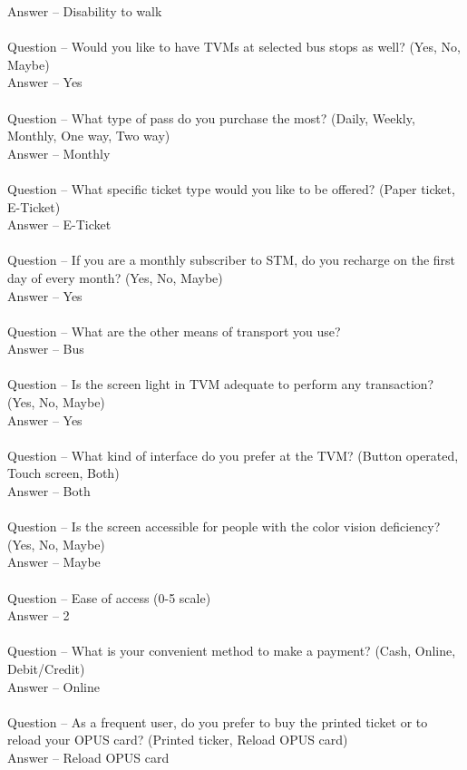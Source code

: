 \documentclass[a4paper, 11pt]{report}
\begin{document}
{Answer – Disability to walk\\\\
Question – Would you like to have TVMs at selected bus stops as well? (Yes, No, Maybe)\\
Answer – Yes\\\\
Question – What type of pass do you purchase the most? (Daily, Weekly, Monthly, One way, Two way)\\
Answer – Monthly\\\\
Question – What specific ticket type would you like to be offered? (Paper ticket, E-Ticket)\\
Answer – E-Ticket\\\\
Question – If you are a monthly subscriber to STM, do you recharge on the first day of every month? (Yes, No, Maybe)\\
Answer – Yes\\\\
Question – What are the other means of transport you use?  \\
Answer – Bus\\\\
Question – Is the screen light in TVM adequate to perform any transaction? (Yes, No, Maybe)\\
Answer – Yes\\\\
Question – What kind of interface do you prefer at the TVM? (Button operated, Touch screen, Both)\\
Answer – Both\\\\
Question – Is the screen accessible for people with the color vision deficiency? (Yes, No, Maybe)\\
Answer – Maybe\\\\
Question – Ease of access (0-5 scale)\\
Answer – 2\\\\
Question – What is your convenient method to make a payment? (Cash, Online, Debit/Credit)\\
Answer – Online\\\\
Question – As a frequent user, do you prefer to buy the printed ticket or to reload your OPUS card? (Printed ticker, Reload OPUS card)\\
Answer – Reload OPUS card\\\\
}
\end{document}
